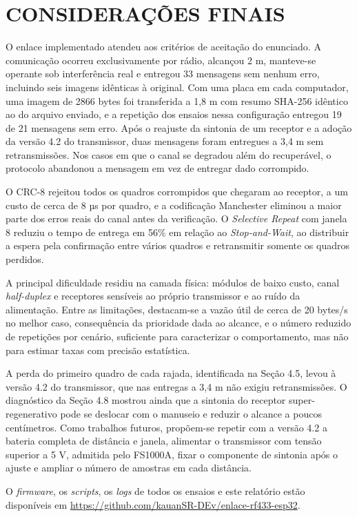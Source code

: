 \documentclass[12pt, oneside, a4paper, sumario=tradicional, chapter=TITLE, brazilian]{abntex2}
\begin{document}
\chapter{CONSIDERAÇÕES FINAIS}
O enlace implementado atendeu aos critérios de aceitação do enunciado. A comunicação ocorreu exclusivamente por rádio, alcançou 2 m, manteve-se operante sob interferência real e entregou 33 mensagens sem nenhum erro, incluindo seis imagens idênticas à original. Com uma placa em cada computador, uma imagem de 2866 bytes foi transferida a 1,8 m com resumo SHA-256 idêntico ao do arquivo enviado, e a repetição dos ensaios nessa configuração entregou 19 de 21 mensagens sem erro. Após o reajuste da sintonia de um receptor e a adoção da versão 4.2 do transmissor, duas mensagens foram entregues a 3,4 m sem retransmissões. Nos casos em que o canal se degradou além do recuperável, o protocolo abandonou a mensagem em vez de entregar dado corrompido.

O CRC-8 rejeitou todos os quadros corrompidos que chegaram ao receptor, a um custo de cerca de 8 µs por quadro, e a codificação Manchester eliminou a maior parte dos erros reais do canal antes da verificação. O \textit{Selective Repeat} com janela 8 reduziu o tempo de entrega em 56\% em relação ao \textit{Stop-and-Wait}, ao distribuir a espera pela confirmação entre vários quadros e retransmitir somente os quadros perdidos.

A principal dificuldade residiu na camada física: módulos de baixo custo, canal \textit{half-duplex} e receptores sensíveis ao próprio transmissor e ao ruído da alimentação. Entre as limitações, destacam-se a vazão útil de cerca de 20 bytes/s no melhor caso, consequência da prioridade dada ao alcance, e o número reduzido de repetições por cenário, suficiente para caracterizar o comportamento, mas não para estimar taxas com precisão estatística.

A perda do primeiro quadro de cada rajada, identificada na Seção 4.5, levou à versão 4.2 do transmissor, que nas entregas a 3,4 m não exigiu retransmissões. O diagnóstico da Seção 4.8 mostrou ainda que a sintonia do receptor super-regenerativo pode se deslocar com o manuseio e reduzir o alcance a poucos centímetros. Como trabalhos futuros, propõem-se repetir com a versão 4.2 a bateria completa de distância e janela, alimentar o transmissor com tensão superior a 5 V, admitida pelo FS1000A, fixar o componente de sintonia após o ajuste e ampliar o número de amostras em cada distância.

O \textit{firmware}, os \textit{scripts}, os \textit{logs} de todos os ensaios e este relatório estão disponíveis em \url{https://github.com/kauanSR-DEv/enlace-rf433-esp32}.
\end{document}
